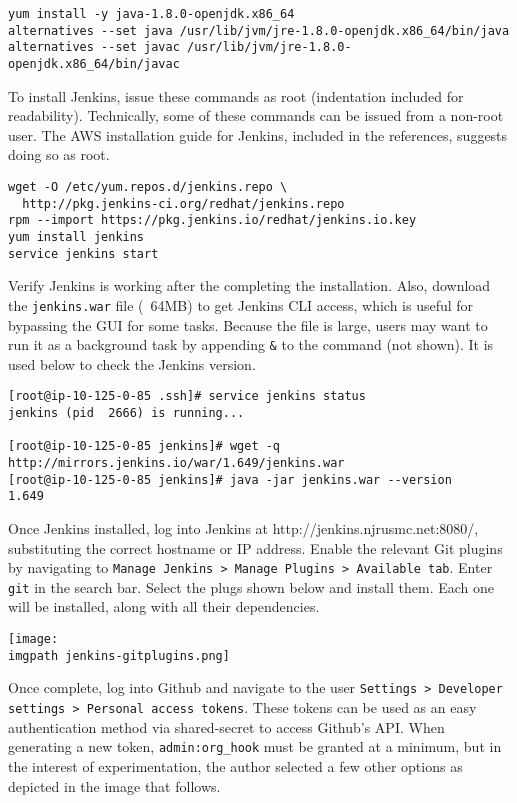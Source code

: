 \begin{verbatim}
yum install -y java-1.8.0-openjdk.x86_64
alternatives --set java /usr/lib/jvm/jre-1.8.0-openjdk.x86_64/bin/java
alternatives --set javac /usr/lib/jvm/jre-1.8.0-openjdk.x86_64/bin/javac
\end{verbatim}

To install Jenkins, issue these commands as root (indentation included for
readability). Technically, some of these commands can be issued from a
non-root user. The AWS installation guide for Jenkins, included in the
references, suggests doing so as root.

\begin{verbatim}
wget -O /etc/yum.repos.d/jenkins.repo \
  http://pkg.jenkins-ci.org/redhat/jenkins.repo
rpm --import https://pkg.jenkins.io/redhat/jenkins.io.key
yum install jenkins
service jenkins start
\end{verbatim}

Verify Jenkins is working after the completing the installation. Also,
download the \verb|jenkins.war| file (~64MB) to get Jenkins CLI access, which is
useful for bypassing the GUI for some tasks. Because the file is large, users
may want to run it as a background task by appending \verb|&| to the command
(not shown). It is used below to check the Jenkins version.

\begin{verbatim}
[root@ip-10-125-0-85 .ssh]# service jenkins status
jenkins (pid  2666) is running...

[root@ip-10-125-0-85 jenkins]# wget -q http://mirrors.jenkins.io/war/1.649/jenkins.war
[root@ip-10-125-0-85 jenkins]# java -jar jenkins.war --version
1.649
\end{verbatim}

Once Jenkins installed, log into Jenkins at http://jenkins.njrusmc.net:8080/,
substituting the correct hostname or IP address. Enable the relevant Git
plugins by navigating to \verb|Manage Jenkins > Manage Plugins > Available tab|.
Enter \verb|git| in the search bar. Select the plugs shown below and install
them. Each one will be installed, along with all their dependencies.

    \begin{minipage}[t]{\linewidth}
	  \centering
      \texttt{[image: \\imgpath jenkins-gitplugins.png]}
    \end{minipage}

Once complete, log into Github and navigate to the user
\verb|Settings > Developer settings > Personal access tokens|. These tokens
can be used as an easy authentication method via shared-secret to access
Github's API. When generating a new token, \verb|admin:org_hook| must be granted at a
minimum, but in the interest of experimentation, the author selected a few
other options as depicted in the image that follows.

